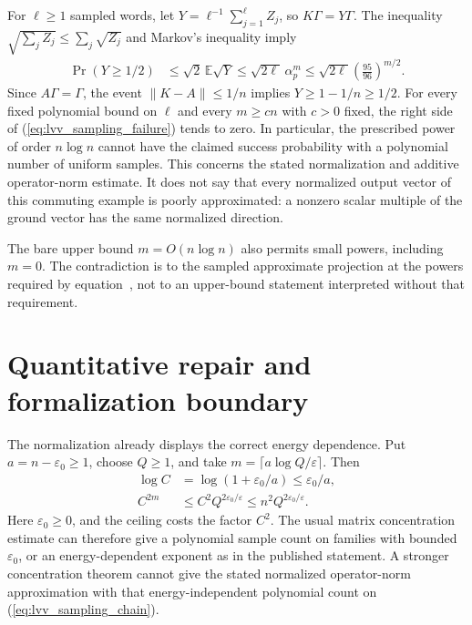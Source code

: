\documentclass{article}
\begin{document}
For $\ell\ge1$ sampled words, let
$Y=\ell^{-1}\sum_{j=1}^{\ell}Z_j$, so $K\Gamma=Y\Gamma$.
The inequality $\sqrt{\sum_jZ_j}\le\sum_j\sqrt{Z_j}$ and Markov's
inequality imply
\begin{align}
    \Pr(Y\ge1/2)
     & \le \sqrt2\,\mathbb E\sqrt Y
    \le\sqrt{2\ell}\,\alpha_p^m
    \le\sqrt{2\ell}\left(\frac{95}{96}\right)^{m/2}.
    \label{eq:lvv_sampling_failure}
\end{align}
Since $A\Gamma=\Gamma$, the event $\|K-A\|\le1/n$ implies
$Y\ge1-1/n\ge1/2$. For every fixed polynomial bound on $\ell$ and every
$m\ge cn$ with $c>0$ fixed, the right side of
(\ref{eq:lvv_sampling_failure}) tends to zero. In particular, the
prescribed power of order $n\log n$ cannot have the claimed success
probability with a polynomial number of uniform samples.
This concerns the stated normalization and additive operator-norm estimate.
It does not say that every normalized output vector of this commuting
example is poorly approximated: a nonzero scalar multiple of the ground
vector has the same normalized direction.

The bare upper bound $m=O(n\log n)$ also permits small powers, including
$m=0$. The contradiction is to the sampled approximate projection at
the powers required by equation~, not to an
upper-bound statement interpreted without that requirement.

\section{Quantitative repair and formalization boundary}

The normalization already displays the correct energy dependence. Put
$a=n-\varepsilon_0\ge1$, choose $Q\ge1$, and take
$m=\lceil a\log Q/\varepsilon\rceil$. Then
\begin{align}
    \log C
     & =\log(1+\varepsilon_0/a)\le\varepsilon_0/a, \\
    C^{2m}
     & \le C^2Q^{2\varepsilon_0/\varepsilon}
    \le n^2Q^{2\varepsilon_0/\varepsilon}.
    \label{eq:lvv_sampling_energy_dependence}
\end{align}
Here $\varepsilon_0\ge0$, and the ceiling costs the factor $C^2$.
The usual matrix concentration estimate can therefore give a polynomial
sample count on families with bounded $\varepsilon_0$, or an
energy-dependent exponent as in the published statement. A stronger
concentration theorem cannot give the stated normalized operator-norm
approximation with that energy-independent polynomial count on
(\ref{eq:lvv_sampling_chain}).
\end{document}
